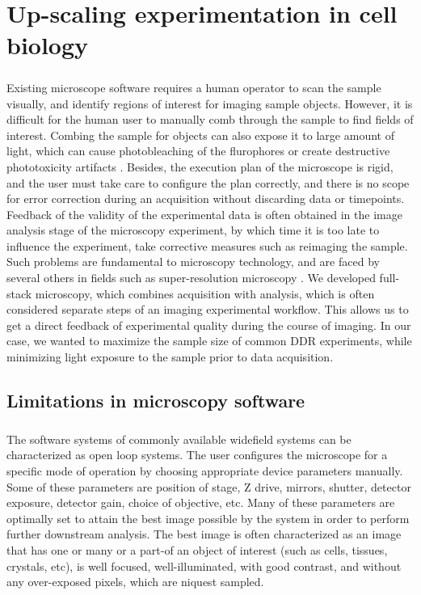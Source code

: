 \chapter{Up-scaling experimentation in cell biology}
\paragraph*{} Existing microscope software requires a human operator to scan the sample visually, and identify regions of interest for imaging sample objects. However, it is difficult for the human user to manually comb through the sample to find fields of interest. Combing the sample for objects can also expose it to large amount of light, which can cause photobleaching of the flurophores or create destructive phototoxicity artifacts \cite{scherf2015smart}. Besides, the execution plan of the microscope is rigid, and the user must take care to configure the plan correctly, and there is no scope for error correction during an acquisition without discarding data or timepoints. Feedback of the validity of the experimental data is often obtained in the image analysis stage of the microscopy experiment, by which time it is too late to influence the experiment, take corrective measures such as reimaging the sample. Such problems are fundamental to microscopy technology, and are faced by several others in fields such as super-resolution microscopy \cite{D1SC05506B}. We developed full-stack microscopy, which combines acquisition with analysis, which is often considered separate steps of an imaging experimental workflow. This allows us to get a direct feedback of experimental quality during the course of imaging. In our case, we wanted to maximize the sample size of common DDR experiments, while minimizing light exposure to the sample prior to data acquisition.


\section{Limitations in microscopy software}

\paragraph*{}The software systems of commonly available widefield systems can be characterized as open loop systems. The user configures the microscope for a specific mode of operation by choosing appropriate device parameters manually. Some of these parameters are position of stage, Z drive, mirrors, shutter, detector exposure, detector gain, choice of objective, etc. Many of these parameters are optimally set to attain the best image possible by the system in order to perform further downstream analysis. The best image is often characterized as an image that has one or many or a part-of an object of interest (such as cells, tissues, crystals, etc), is well focused, well-illuminated, with good contrast, and without any over-exposed pixels, which are niquest sampled.

